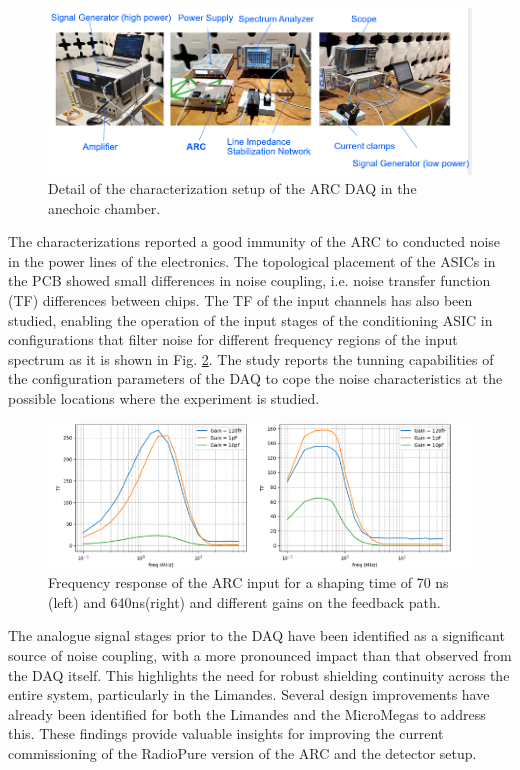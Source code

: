 \begin{figure}[!h]
    \centering
    \includegraphics[width=1\linewidth]{image5.png}
    \caption{Detail of the characterization setup of the ARC DAQ in the anechoic chamber.}
    \label{fig:4.2.2}
\end{figure}
The characterizations reported a good immunity of the ARC to conducted noise in the power lines of the electronics. The topological placement of the ASICs in the PCB showed small differences in noise coupling, i.e. noise transfer function (TF) differences between chips. The TF of the input channels has also been studied, enabling the operation of the input stages of the conditioning ASIC in configurations that filter noise for different frequency regions of the input spectrum as it is shown in Fig. \ref{fig:4.2.2a}. The study reports the tunning capabilities of the configuration parameters of the DAQ to cope the noise characteristics at the possible locations where the experiment is studied.

\begin{figure}[!h]
    \centering
    \includegraphics[width=0.75\linewidth]{image6.png}
    \caption{Frequency response of the ARC input for a shaping time of 70 ns (left) and 640ns(right) and different gains on the feedback path.}
    \label{fig:4.2.2a}
\end{figure}
The analogue signal stages prior to the DAQ have been identified as a significant source of noise coupling, with a more pronounced impact than that observed from the DAQ itself. This highlights the need for robust shielding continuity across the entire system, particularly in the Limandes. Several design improvements have already been identified for both the Limandes and the MicroMegas to address this. These findings provide valuable insights for improving the current commissioning of the RadioPure version of the ARC and the detector setup. 

